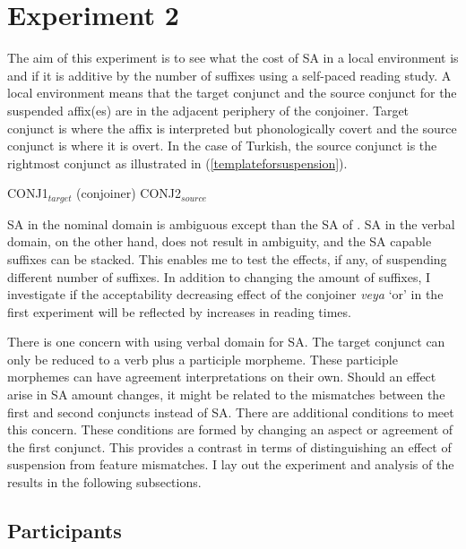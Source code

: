 










\section{Experiment 2}

The aim of this experiment is to see what the cost of SA in a local environment is and if it is additive by the number of suffixes using a self-paced reading study. A local environment means that the target conjunct and the source conjunct for the suspended affix(es) are in the adjacent periphery of the conjoiner. Target conjunct is where the affix is interpreted but phonologically covert and the source conjunct is where it is overt. In the case of Turkish, the source conjunct is the rightmost conjunct as illustrated in (\ref{templateforsuspension}).

\begin{exe}
\ex \label{templateforsuspension}
CONJ1$_{target}$ (conjoiner) CONJ2$_{source}$ 
\end{exe}

SA in the nominal domain is ambiguous except than the SA of {\Case}. SA in the verbal domain, on the other hand, does not result in ambiguity, and the SA capable suffixes can be stacked. This enables me to test the effects, if any, of suspending different number of suffixes. In addition to changing the amount of suffixes, I investigate if the acceptability decreasing effect of the conjoiner \textit{veya} `or' in the first experiment will be reflected by increases in reading times.

There is one concern with using verbal domain for SA. The target conjunct can only be reduced to a verb plus a participle morpheme. These participle morphemes can have {\Tsg} agreement interpretations on their own. Should an effect arise in SA amount changes, it might be related to the mismatches between the first and second conjuncts instead of SA. There are additional conditions to meet this concern. These conditions are formed by changing an aspect or agreement of the first conjunct. This provides a contrast in terms of distinguishing an effect of suspension from feature mismatches. I lay out the experiment and analysis of the results in the following subsections.


\subsection{Participants}


